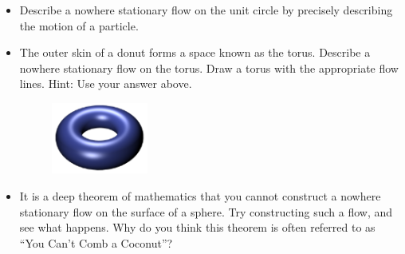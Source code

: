 	\begin{itemize}
	\item Describe a nowhere stationary flow on the unit circle by precisely describing the motion of a particle.
	\item The outer skin of a donut forms a space known as the torus. Describe a nowhere stationary flow on the torus. Draw a torus with the appropriate flow lines. Hint: Use your answer above.
	\begin{figure}[H]
	   \centering
	   \includegraphics[width=0.3\textwidth]{season2/204/images/bluetorus.png} 
	\end{figure}
	\item It is a deep theorem of mathematics that you cannot construct a nowhere stationary flow on the surface of a sphere. Try constructing such a flow, and see what happens. Why do you think this theorem is often referred to as ``You Can't Comb a Coconut''?
	\end{itemize}

